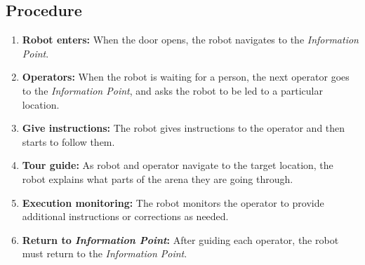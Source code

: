 \subsection*{Procedure}
\begin{enumerate}[nosep]

	\item \textbf{Robot enters:} When the door opens, the robot navigates to the \emph{Information Point}.
	\item \textbf{Operators:} When the robot is waiting for a person, the next operator goes to the \emph{Information Point}, and asks the robot to be led to a particular location.
	\item \textbf{Give instructions:} The robot gives instructions to the operator and then starts to follow them.
	\item \textbf{Tour guide:} As robot and operator navigate to the target location, the robot explains what parts of the arena they are going through.
	\item \textbf{Execution monitoring:} The robot monitors the operator to provide additional instructions or corrections as needed.
	\item \textbf{Return to \emph{Information Point}:} After guiding each operator, the robot must return to the \emph{Information Point}.

\end{enumerate}

